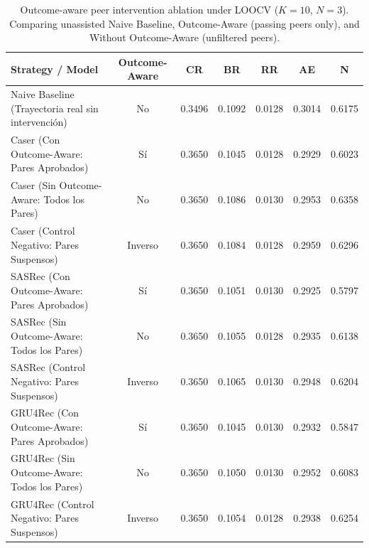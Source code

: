 \begin{table}[ht!]
\centering
\caption{Outcome-aware peer intervention ablation under LOOCV ($K=10$, $N=3$). Comparing unassisted Naive Baseline, Outcome-Aware (passing peers only), and Without Outcome-Aware (unfiltered peers).}
\label{tab:ablation_outcome_aware}
\begin{tabular}{lcccccc}
\hline
\textbf{Strategy / Model} & \textbf{Outcome-Aware} & \textbf{CR} & \textbf{BR} & \textbf{RR} & \textbf{AE} & \textbf{N} \\
\hline
Naive Baseline (Trayectoria real sin intervención) & No & 0.3496 & 0.1092 & 0.0128 & 0.3014 & 0.6175 \\
Caser (Con Outcome-Aware: Pares Aprobados) & Sí & 0.3650 & 0.1045 & 0.0128 & 0.2929 & 0.6023 \\
Caser (Sin Outcome-Aware: Todos los Pares) & No & 0.3650 & 0.1086 & 0.0130 & 0.2953 & 0.6358 \\
Caser (Control Negativo: Pares Suspensos) & Inverso & 0.3650 & 0.1084 & 0.0128 & 0.2959 & 0.6296 \\
SASRec (Con Outcome-Aware: Pares Aprobados) & Sí & 0.3650 & 0.1051 & 0.0130 & 0.2925 & 0.5797 \\
SASRec (Sin Outcome-Aware: Todos los Pares) & No & 0.3650 & 0.1055 & 0.0128 & 0.2935 & 0.6138 \\
SASRec (Control Negativo: Pares Suspensos) & Inverso & 0.3650 & 0.1065 & 0.0130 & 0.2948 & 0.6204 \\
GRU4Rec (Con Outcome-Aware: Pares Aprobados) & Sí & 0.3650 & 0.1045 & 0.0130 & 0.2932 & 0.5847 \\
GRU4Rec (Sin Outcome-Aware: Todos los Pares) & No & 0.3650 & 0.1050 & 0.0130 & 0.2952 & 0.6083 \\
GRU4Rec (Control Negativo: Pares Suspensos) & Inverso & 0.3650 & 0.1054 & 0.0128 & 0.2938 & 0.6254 \\
\hline
\end{tabular}
\end{table}
